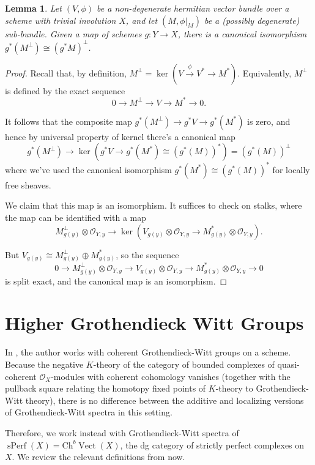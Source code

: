 \documentclass[draftthesis,tocnosub,noragright,centerchapter,10pt]{uiucthesis2009}
\newcommand{\mc}{\mathcal}
\DeclareMathOperator{\Vect}{Vect}
\DeclareMathOperator{\sPerf}{sPerf}
\theoremstyle{plain}
\newtheorem{lemma}{Lemma}
\theoremstyle{definition}
\begin{document}
\begin{lemma}\label{lem:perp_pullback}
Let $(V,\phi)$ be a non-degenerate hermitian vector bundle over a
scheme with trivial involution $X$, and let $(M,\phi|_M)$ be a (possibly degenerate)
sub-bundle. Given a map of schemes $g : Y \rightarrow X$, there is a
canonical isomorphism
$g^*(M^\perp) \cong (g^*M)^\perp$.
\end{lemma}

\begin{proof}
Recall that, by definition, $M^\perp = \ker(V \xrightarrow{\phi} V^*
\rightarrow M^*)$. Equivalently, $M^\perp$
is defined by the exact sequence
\[
0 \rightarrow M^\perp \rightarrow V \rightarrow M^* \rightarrow 0.
\] 

It follows that the composite map $g^*(M^\perp) \rightarrow g^*V
\rightarrow g^*(M^*)$ is zero, and hence by universal property of kernel there's a canonical map
\[
g^*(M^\perp) \rightarrow \ker(g^*V \rightarrow g^*(M^*) \cong (g^*(M))^*) = (g^*(M))^\perp
\]
 where we've used the canonical isomorphism $g^*(M^*) \cong
 (g^*(M))^*$ for locally free sheaves.

We claim that this map is an isomorphism. It suffices to check on
stalks, where the map can be identified with a map 
\[
M^\perp_{g(y)} \otimes \mc O_{Y,y} \rightarrow \ker(V_{g(y)} \otimes
\mc O_{Y,y} \rightarrow M^*_{g(y)} \otimes \mc O_{Y,y}).
\]

But $V_{g(y)} \cong M^\perp_{g(y)} \oplus M^*_{g(y)}$, so the sequence
\[
0 \rightarrow M^\perp_{g(y)} \otimes \mc O_{Y,y}\rightarrow V_{g(y)}
\otimes \mc O_{Y,y} \rightarrow M^*_{g(y)} \otimes \mc O_{Y,y}
\rightarrow 0
\]
is split exact, and the canonical map is an isomorphism. 
\end{proof}


\chapter{Higher Grothendieck Witt Groups}\label{chap:higher_GW}

In \cite{Xie2018ATM}, the author works with coherent Grothendieck-Witt
groups on a scheme. Because the negative $K$-theory of the category of
bounded complexes of quasi-coherent $\mc O_X$-modules with coherent
cohomology vanishes (together with the pullback square relating the
homotopy fixed points of $K$-theory to Grothendieck-Witt theory), there is no difference between the additive and
localizing versions of Grothendieck-Witt spectra in this
setting. 

Therefore, we work instead with Grothendieck-Witt spectra of
$\sPerf(X) = \mathrm{Ch}^b\Vect(X)$, the dg category of strictly
perfect complexes on $X$. We review the relevant definitions from
\cite{Schder} now.
\end{document}
